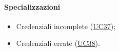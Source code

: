 \paragraph*{Specializzazioni}
\begin{itemize}
  \item Credenziali incomplete (\hyperref[UC37]{UC37});
  \item Credenziali errate (\hyperref[UC38]{UC38}).
\end{itemize}







